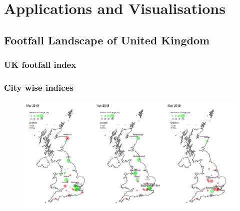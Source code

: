 \chapter{Applications and Visualisations} \label{chapter:application}

\lipsum[1-2]

\section{Footfall Landscape of United Kingdom}
\lipsum[3]
\subsection{UK footfall index}
\lipsum[1]

\subsection{City wise indices}
\lipsum[1]

\begin{figure}
  \includegraphics[trim={0 0 0 0},clip]{images/applications-city-indices.png}
  \caption{}
  \label{}
\end{figure}

